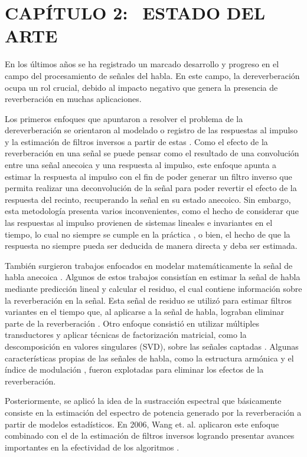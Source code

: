\section[Estado del Arte]{CAPÍTULO 2:$\ \ \ \ $ESTADO DEL ARTE} 

En los últimos años se ha registrado un marcado desarrollo y progreso en el campo del procesamiento de señales del habla. En este campo, la dereverberación ocupa un rol crucial, debido al impacto negativo que genera la presencia de reverberación en muchas aplicaciones. 

Los primeros enfoques que apuntaron a resolver el problema de la dereverberación se orientaron al modelado o registro de las respuestas al impulso y la estimación de filtros inversos a partir de estas \cite{filtros_inv}. Como el efecto de la reverberación en una señal se puede pensar como el resultado de una convolución entre una señal anecoica y una respuesta al impulso, este enfoque apunta a estimar la respuesta al impulso con el fin de poder generar un filtro inverso que permita realizar una deconvolución de la señal para poder revertir el efecto de la respuesta del recinto, recuperando la señal en su estado anecoico. Sin embargo, esta metodología presenta varios inconvenientes, como el hecho de considerar que las respuestas al impulso provienen de sistemas lineales e invariantes en el tiempo, lo cual no siempre se cumple en la práctica \cite{LTI}, o bien, el hecho de que la respuesta no siempre pueda ser deducida de manera directa y deba ser estimada. 


También surgieron trabajos enfocados en modelar matemáticamente la señal de habla anecoica  \cite{rabiner}. Algunos de estos trabajos consistían en estimar la señal de habla mediante predicción lineal y calcular el residuo, el cual contiene información sobre la reverberación en la señal. Esta señal de residuo se utilizó para estimar filtros variantes en el tiempo que, al aplicarse a la señal de habla, lograban eliminar parte de la reverberación \cite{LPresiduo}. Otro enfoque consistió en utilizar múltiples transductores y aplicar técnicas de factorización matricial, como la descomposición en valores singulares (SVD), sobre las señales captadas \cite{multichannel}. Algunas características propias de las señales de habla, como la estructura armónica \cite{armonica} y el índice de modulación  \cite{mod}, fueron explotadas para eliminar los efectos de la reverberación. 

Posteriormente, se aplicó la idea de la sustracción espectral \cite{spect_subtrac} \cite{spect_subtrac2} que básicamente consiste en la estimación del espectro de potencia generado por la reverberación a partir de modelos estadísticos. En 2006, Wang et. al. aplicaron este enfoque combinado con el de la estimación de filtros inversos logrando presentar avances importantes en la efectividad de los algoritmos \cite{two_stage}.
 
